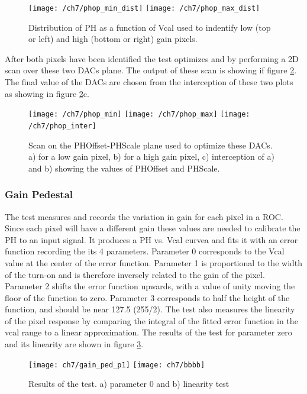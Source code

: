 \begin{figure}[!h]
	\centering
	\texttt{[image: /ch7/phop\_min\_dist]}
	\texttt{[image: /ch7/phop\_max\_dist]}
	\caption[PH vs Vcal]{Distribution of PH as a function of Vcal used to indentify low (top or left) and high (bottom or right) gain pixels.}
	\label{phvcal}
\end{figure}

After both pixels have been identified the test optimizes  and  by performing a 2D scan over these two DACs plane. %
The output of these scan is showing if figure \ref{phovsphs}. The final value of the DACs are chosen from the interception of these two plots as showing in figure \ref{phovsphs}c.  

\begin{figure}[!h]
	\centering
	\texttt{[image: /ch7/phop\_min]}
	\texttt{[image: /ch7/phop\_max]}
	\texttt{[image: /ch7/phop\_inter]}
	\caption[PHOffset and PHScale scan]{Scan on the PHOffset-PHScale plane used to optimize these DACs. a) for a low gain pixel, b) for a high gain pixel, c) interception of a) and b) showing the values of PHOffset and PHScale.}
	\label{phovsphs}
\end{figure}

\subsubsection{Gain Pedestal}
The  test measures and records the variation in gain for each pixel in a ROC. Since each pixel will have a different gain these values are needed to calibrate the PH to an input signal. It produces a PH vs. Vcal curvea and fits it with an error function recording the its 4 parameters. Parameter 0 corresponds to
the Vcal value at the center of the error function. Parameter 1 is proportional to the width of the turn-on and is therefore inversely related to the gain of the pixel. Parameter 2 shifts the error function upwards, with a value of unity moving the floor of the function to zero. Parameter 3 corresponds to half the height of the function, and should be near 127.5 (255/2). {}%
The test also measures the linearity of the pixel response by comparing the integral of the fitted error function in the vcal range to a linear approximation. The results of the test for parameter zero and its linearity are shown in figure \ref{gainped}.

\begin{figure}[!h]
	\centering
	\texttt{[image: ch7/gain\_ped\_p1]}
	\texttt{[image: ch7/bbbb]}
	\caption[Gain pedestal test]{Results of the  test. a) parameter 0 and b) linearity test {}}
	\label{gainped}
\end{figure}

